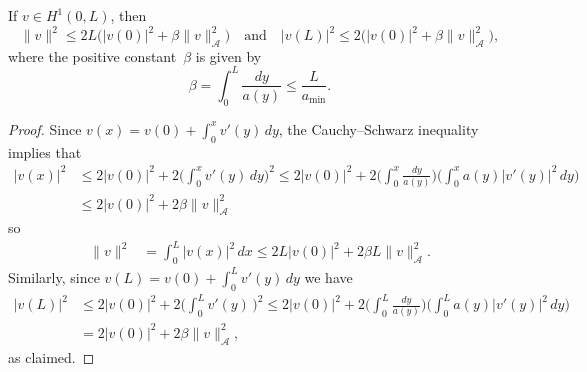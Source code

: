 \begin{lemma}\label{lem: v v'}
If $v\in H^1(0,L)$, then
\[
\|v\|^2\le2L\bigl(|v(0)|^2+\beta\|v\|_{\mathcal{A}}^2\bigr)
\quad\text{and}\quad
|v(L)|^2\le 2\bigl(|v(0)|^2+\beta\|v\|_{\mathcal{A}}^2\bigr),
\]
where the positive constant~$\beta$ is given by
\[
\beta=\int_0^L\frac{dy}{a(y)}\le\frac{L}{a_{\min}}.
\]
\end{lemma}
\begin{proof}
Since $v(x)=v(0)+\int_0^xv'(y)\,dy$, the Cauchy--Schwarz inequality implies that
\begin{align*}
|v(x)|^2&\le2|v(0)|^2+2\biggl(\int_0^x v'(y)\,dy\biggr)^2
\le2|v(0)|^2+2\biggl(\int_0^x\frac{dy}{a(y)}\biggr)
\biggl(\int_0^xa(y)|v'(y)|^2\,dy\biggr)\\
	&\le2|v(0)|^2+2\beta\|v\|_{\mathcal{A}}^2
\end{align*}
so
\begin{align*}
\|v\|^2&=\int_0^L|v(x)|^2\,dx\le 2L|v(0)|^2+2\beta L\|v\|_{\mathcal{A}}^2.
\end{align*}
Similarly, since $v(L)=v(0)+\int_0^Lv'(y)\,dy$ we have
\begin{align*}
|v(L)|^2&\le2|v(0)|^2+2\biggl(\int_0^Lv'(y)\,\biggr)^2
	\le2|v(0)|^2+2\biggl(\int_0^L\frac{dy}{a(y)}\biggr)
	\biggl(\int_0^La(y)|v'(y)|^2\,dy\biggr)\\
	&=2|v(0)|^2+2\beta\|v\|_{\mathcal{A}}^2,
\end{align*}
as claimed.
\end{proof}

